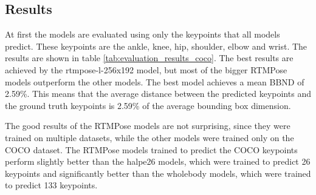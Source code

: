 \subsection{Results}
\label{evaluation_results}
At first the models are evaluated using only the keypoints that all models predict. These keypoints are the ankle, knee, hip, shoulder, elbow and wrist. The results are shown in table \ref{tab:evaluation_results_coco}. The best results are achieved by the rtmpose-l-256x192 model, but most of the bigger RTMPose models outperform the other models. The best model achieves a mean BBND of 2.59\%. This means that the average distance between the predicted keypoints and the ground truth keypoints is 2.59\% of the average bounding box dimension.

The good results of the RTMPose models are not surprising, since they were trained on multiple datasets, while the other models were trained only on the COCO dataset. The RTMPose models trained to predict the COCO keypoints perform slightly better than the halpe26 models, which were trained to predict 26 keypoints and significantly better than the wholebody models, which were trained to predict 133 keypoints.

